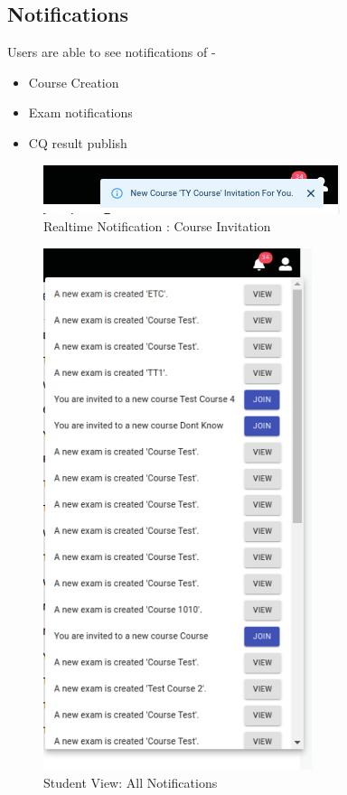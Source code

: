 \documentclass[10pt]{article}
\begin{document}
\subsection{Notifications}

Users are able to see notifications of -

\begin{itemize}
  \item Course Creation
  \item Exam notifications
  \item CQ result publish
\end{itemize}

\begin{figure}[H]
  \centering
  \centerline{\includegraphics[width=\textwidth]{studnt/course-create-notification-realtime.png}}
  \caption{Realtime Notification :  Course Invitation}
  \label{fig}
\end{figure}

\begin{figure}[H]
  \centering
  \centerline{\includegraphics[width=0.7\textwidth,height=0.7\textheight ]{studnt/notifications.png}}
  \caption{Student View: All Notifications}
  \label{fig}
\end{figure}
\end{document}
